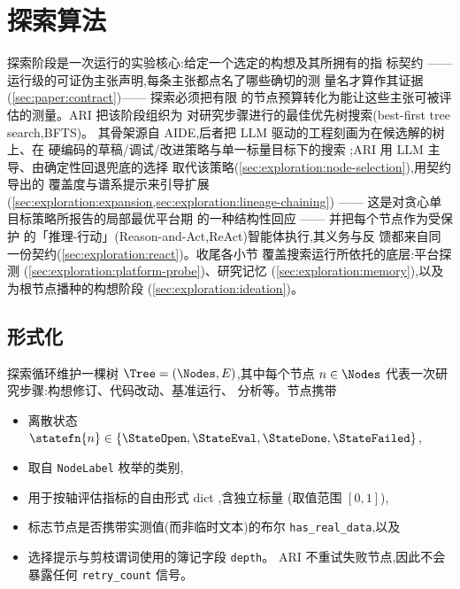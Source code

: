 \section{探索算法}\label{sec:exploration}

探索阶段是一次运行的实验核心:给定一个选定的构想及其所拥有的指
标契约 —— 运行级的可证伪主张声明,每条主张都点名了哪些确切的测
量名才算作其证据(\cref{sec:paper:contract})—— 探索必须把有限
的节点预算转化为能让这些主张可被评估的测量。ARI 把该阶段组织为
对研究步骤进行的最佳优先树搜索(best-first tree search,BFTS)。
其骨架源自 AIDE,后者把 LLM 驱动的工程刻画为在候选解的树上、在
硬编码的草稿/调试/改进策略与单一标量目标下的搜索
\cite{jiang2025aide};ARI 用 LLM 主导、由确定性回退兜底的选择
取代该策略(\cref{sec:exploration:node-selection}),用契约导出的
覆盖度与谱系提示来引导扩展
(\cref{sec:exploration:expansion,sec:exploration:lineage-chaining})
—— 这是对贪心单目标策略所报告的局部最优平台期
\cite{jiang2025aide} 的一种结构性回应 —— 并把每个节点作为受保护
的「推理-行动」(Reason-and-Act,ReAct)智能体执行,其义务与反
馈都来自同一份契约(\cref{sec:exploration:react})。收尾各小节
覆盖搜索运行所依托的底层:平台探测
(\cref{sec:exploration:platform-probe})、研究记忆
(\cref{sec:exploration:memory}),以及为根节点播种的构想阶段
(\cref{sec:exploration:ideation})。

\subsection{形式化}\label{sec:exploration:formalization}

探索循环维护一棵树 $\Tree=(\Nodes, E)$,其中每个节点
$n\in\Nodes$ 代表一次研究步骤:构想修订、代码改动、基准运行、
分析等。节点携带

\begin{itemize}
  \item 离散状态
        $\statefn{n}\in\{\StateOpen,\allowbreak\StateEval,\allowbreak\StateDone,\allowbreak\StateFailed\}$,
  \item 取自 \texttt{NodeLabel} 枚举的类别,
  \item 用于按轴评估指标的自由形式 dict
        ,含独立标量
        (取值范围 $[0,1]$),
  \item 标志节点是否携带实测值(而非临时文本)的布尔
        \texttt{has\_real\_data},以及
  \item 选择提示与剪枝谓词使用的簿记字段 \texttt{depth}。
        ARI 不重试失败节点,因此不会暴露任何 \texttt{retry\_count}
        信号。
\end{itemize}

